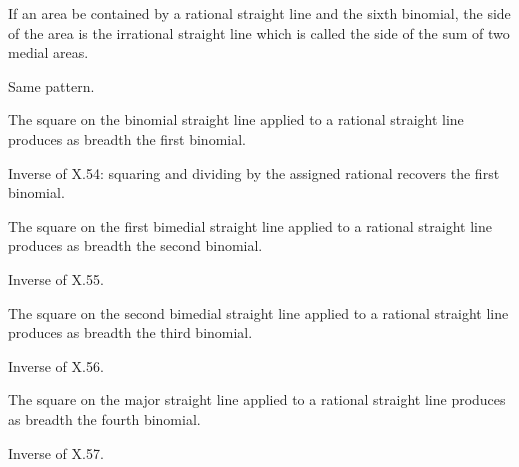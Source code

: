 \documentclass{rrxiv}
\begin{document}
\begin{claim}
\label{prop:X.59}
If an area be contained by a rational straight line and the sixth
binomial, the side of the area is the irrational straight line which
is called the side of the sum of two medial areas.
\end{claim}
\begin{evidence}[Proof of X.59]
\label{ev:X.59}
Same pattern.
\end{evidence}

\begin{claim}
\label{prop:X.60}
The square on the binomial straight line applied to a rational
straight line produces as breadth the first binomial.
\end{claim}
\begin{evidence}[Proof of X.60]
\label{ev:X.60}
Inverse of X.54: squaring and dividing by the assigned rational
recovers the first binomial.
\end{evidence}

\begin{claim}
\label{prop:X.61}
The square on the first bimedial straight line applied to a rational
straight line produces as breadth the second binomial.
\end{claim}
\begin{evidence}[Proof of X.61]
\label{ev:X.61}
Inverse of X.55.
\end{evidence}

\begin{claim}
\label{prop:X.62}
The square on the second bimedial straight line applied to a rational
straight line produces as breadth the third binomial.
\end{claim}
\begin{evidence}[Proof of X.62]
\label{ev:X.62}
Inverse of X.56.
\end{evidence}

\begin{claim}
\label{prop:X.63}
The square on the major straight line applied to a rational straight
line produces as breadth the fourth binomial.
\end{claim}
\begin{evidence}[Proof of X.63]
\label{ev:X.63}
Inverse of X.57.
\end{evidence}
\end{document}
